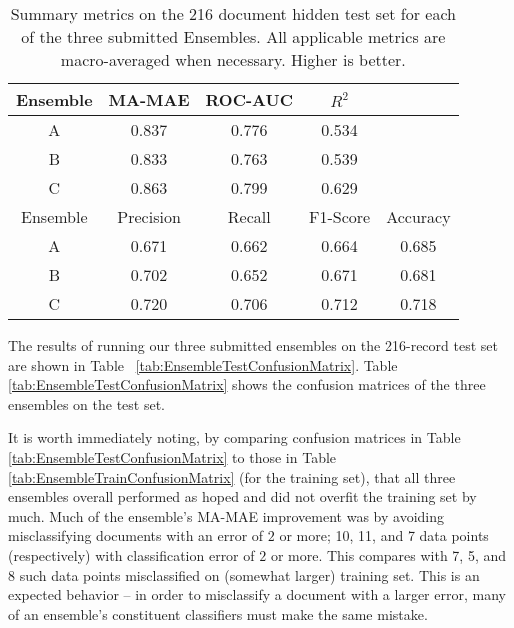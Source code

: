 \begin{table}
\centering
    \begin{tabular}{|c|c|c|c|c|}
        \hline
        \textsf{ Ensemble } & \textsf{ MA-MAE } & \textsf{ ROC-AUC } & \textsf{ $R^2$ } & \\
        \hline
       \cellcolor{gray!15} \textsf{ A } & 0.837 & 0.776 & 0.534 & \\ 
       \cellcolor{gray!15} \textsf{ B } & 0.833 & 0.763 & 0.539 & \\ 
       \cellcolor{gray!15} \textsf{ C } & \cellcolor{gray!15} 0.863 & \cellcolor{gray!15} 0.799 & \cellcolor{gray!15} 0.629 & \\ 
       \hline
        \textsf{ Ensemble } & \textsf{ Precision } & \textsf{ Recall } & \textsf{ F1-Score } & \textsf{ Accuracy } \\
        \hline
       \cellcolor{gray!15} \textsf{ A } & 0.671 & 0.662 & 0.664 & 0.685 \\ 
       \cellcolor{gray!15} \textsf{ B } & 0.702 & 0.652 & 0.671 & 0.681 \\ 
       \cellcolor{gray!15} \textsf{ C } & \cellcolor{gray!15} 0.720 & \cellcolor{gray!15} 0.706 & \cellcolor{gray!15} 0.712 & \cellcolor{gray!15} 0.718 \\ 
        \hline
    \end{tabular}
    \caption{Summary metrics on the 216 document hidden test set for each of the three submitted Ensembles. All applicable metrics are macro-averaged when necessary. Higher is better.}
    \label{tab:EnsembleTestSummaryMetrics}
\end{table}



The results of running our three submitted ensembles on the
216-record test set are shown in Table ~\ref{tab:EnsembleTestConfusionMatrix}.
Table \ref{tab:EnsembleTestConfusionMatrix} shows the confusion
matrices of the three ensembles on the test set.

It is worth immediately noting, by comparing confusion
matrices in  Table \ref{tab:EnsembleTestConfusionMatrix}
to those in Table \ref{tab:EnsembleTrainConfusionMatrix}
(for the training set), that all three ensembles overall
performed as hoped and did not overfit the training
set by much. Much of the ensemble's MA-MAE improvement was by avoiding misclassifying documents
with an error of $2$ or more; 10, 11, and 7 data points (respectively) with classification
error of $2$ or more. This compares with 7, 5, and 8 such
data points misclassified on (somewhat larger) training set. 
This is an expected behavior -- in order to misclassify a document with a larger error,
many of an ensemble's constituent classifiers must make the same mistake.

